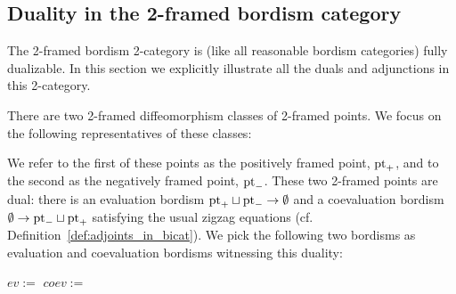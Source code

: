 \documentclass{amsart}
\begin{document}
\subsection{Duality in the 2-framed bordism category}\label{sec:framed-duality}


The 2-framed bordism 2-category is (like all reasonable bordism categories) fully dualizable.  In this section we explicitly illustrate all the duals and adjunctions in this 2-category.

There are two 2-framed diffeomorphism classes of 2-framed points.  We focus on the following representatives of these classes:
\begin{center}
\hspace{1.5cm}
\end{center}
We refer to the first of these points as the positively framed point, $\mathrm{pt}_+$, and to the second as the negatively framed point, $\mathrm{pt}_-$.  These two 2-framed points are dual: there is an evaluation bordism $\mathrm{pt}_+ \sqcup \mathrm{pt}_- \rightarrow \emptyset$ and a coevaluation bordism $\emptyset \rightarrow \mathrm{pt}_- \sqcup \mathrm{pt}_+$ satisfying the usual zigzag equations (cf. Definition~\ref{def:adjoints_in_bicat}).  We pick the following two bordisms as evaluation and coevaluation bordisms witnessing this duality:
\begin{center}
	$ev :=$
	\hspace{1.5cm}
	$coev :=$ 
\end{center}
\end{document}
